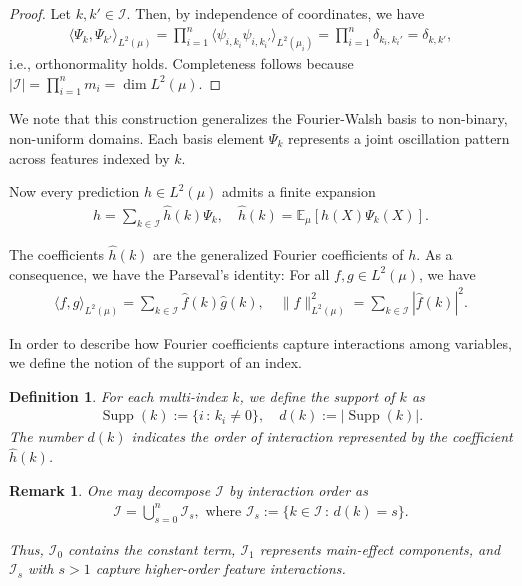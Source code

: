 \documentclass[letterpaper,11pt]{article}
\numberwithin{equation}{section}
\newtheorem{definition}[theorem]{Definition}
\newtheorem{remark}[theorem]{Remark}
\newcommand{\supp}{\operatorname{Supp}}
\numberwithin{equation}{section}
\begin{document}
\begin{proof}
    Let $k,k'\in \mathcal{I}$. Then, by independence of coordinates, we have
    \begin{align*}
        \langle \Psi_k,\Psi_{k'} \rangle_{L^2(\mu)}= \prod_{i=1}^n \langle \psi_{i,k_i} \psi_{i,k_i'} \rangle_{L^2(\mu_i)} = \prod_{i=1}^n \delta_{k_i,k_i'}=\delta_{k,k'},
    \end{align*}
    i.e., orthonormality holds. Completeness follows because $|\mathcal{I}|= \prod_{i=1}^n m_i=\dim L^2(\mu)$.
\end{proof}

We note that this construction generalizes the Fourier-Walsh basis to non-binary, non-uniform domains. Each basis element $\Psi_k$ represents a joint oscillation pattern across features indexed by $k$.

Now every prediction $h\in L^2(\mu)$ admits a finite expansion
\begin{align}
    \label{decomposition:h:Fourier}
    h=\sum_{k\in \mathcal{I}} \hat{h}(k) \Psi_k,\quad \hat{h}(k)=\mathbb{E}_{\mu} [h(X)\Psi_k(X)].
\end{align}

The coefficients $\hat{h}(k)$ are the generalized Fourier coefficients of $h$. As a consequence, we have the Parseval's identity: For all $f,g\in L^2(\mu)$, we have
    \begin{align*}
    \langle f,g \rangle_{L^2(\mu)}=\sum_{k\in \mathcal{I}} \hat{f}(k)\hat{g}(k),\quad \|f\|_{L^2(\mu)}^2=\sum_{k\in \mathcal{I}} |\hat{f}(k)|^2.  
    \end{align*}

In order to describe how Fourier coefficients capture interactions among variables, we define the notion of the support of an index.

\begin{definition}
    For each multi-index $k$, we define the support of $k$ as
\begin{align}
    \label{def:supp:k}
    \supp(k):=\{i\,:\, k_i\neq 0\},\quad d(k):=|\supp(k)|.
\end{align}
The number $d(k)$ indicates the order of interaction represented by the coefficient $\hat{h}(k)$.
\end{definition}

\begin{remark}
One may decompose $\mathcal{I}$ by interaction order as
\begin{align}
    \label{decomposition:I}
    \mathcal{I}= \bigcup_{s=0}^n \mathcal{I}_s,\text{ where }\mathcal{I}_s :=\{k\in \mathcal{I}\,:\, d(k)=s\}.
\end{align}

Thus, $\mathcal{I}_0$ contains the constant term, $\mathcal{I}_1$ represents main-effect components, and $\mathcal{I}_s$ with $s>1$ capture higher-order feature interactions.
\end{remark}
\end{document}
